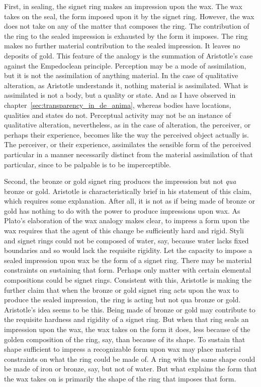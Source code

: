 First, in sealing, the signet ring makes an impression upon the wax. The wax takes on the seal, the form imposed upon it by the signet ring. However, the wax does not take on any of the matter that composes the ring.  The contribution of the ring to the sealed impression is exhausted by the form it imposes. The ring makes no further material contribution to the sealed impression. It leaves no deposits of gold. This feature of the analogy is the summation of Aristotle's case against the Empedoclean principle. Perception may be a mode of assimilation, but it is not the assimilation of anything material. In the case of qualitative alteration, as Aristotle understands it, nothing material is assimilated. What is assimilated is not a body, but a quality or state. And as I have observed in chapter~\ref{sec:transparency_in_de_anima}, whereas bodies have locations, qualities and states do not. Perceptual activity may not be an instance of qualitative alteration, nevertheless, as in the case of alteration, the perceiver, or perhaps their experience, becomes like the way the perceived object actually is. The perceiver, or their experience, assimilates the sensible form of the perceived particular in a manner necessarily distinct from the material assimilation of that particular, since to be palpable is to be imperceptible.

Second, the bronze or gold signet ring produces the impression but not \emph{qua} bronze or gold. Aristotle is characteristically brief in his statement of this claim, which requires some explanation. After all, it is not as if being made of bronze or gold has nothing to do with the power to produce impressions upon wax. As Plato's elaboration of the wax analogy makes clear, to impress a form upon the wax requires that the agent of this change be sufficiently hard and rigid. Styli and signet rings could not be composed of water, say, because water lacks fixed boundaries and so would lack the requisite rigidity. Let the capacity to impose a sealed impression upon wax be the form of a signet ring. There may be material constraints on sustaining that form. Perhaps only matter with certain elemental compositions could be signet rings. Consistent with this, Aristotle is making the further claim that when the bronze or gold signet ring acts upon the wax to produce the sealed impression, the ring is acting but not qua bronze or gold. Aristotle's idea seems to be this. Being made of bronze or gold may contribute to the requisite hardness and rigidity of a signet ring. But when that ring seals an impression upon the wax, the wax takes on the form it does, less because of the golden composition of the ring, say, than because of its shape. To sustain that shape sufficient to impress a recognizable form upon wax may place material constraints on what the ring could be made of. A ring with the same shape could be made of iron or bronze, say, but not of water. But what explains the form that the wax takes on is primarily the shape of the ring that imposes that form.

